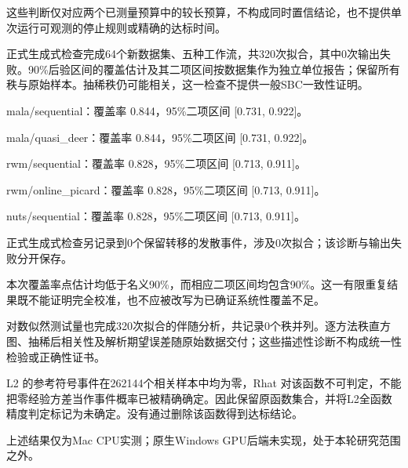 这些判断仅对应两个已测量预算中的较长预算，不构成同时置信结论，也不提供单次运行可观测的停止规则或精确的达标时间。

正式生成式检查完成64个新数据集、五种工作流，共320次拟合，其中0次输出失败。90\%后验区间的覆盖估计及其二项区间按数据集作为独立单位报告；保留所有秩与原始样本。抽稀秩仍可能相关，这一检查不提供一般SBC一致性证明。

\noindent mala/sequential：覆盖率 0.844，95\%二项区间 [0.731, 0.922]。\par

\noindent mala/quasi\_deer：覆盖率 0.844，95\%二项区间 [0.731, 0.922]。\par

\noindent rwm/sequential：覆盖率 0.828，95\%二项区间 [0.713, 0.911]。\par

\noindent rwm/online\_picard：覆盖率 0.828，95\%二项区间 [0.713, 0.911]。\par

\noindent nuts/sequential：覆盖率 0.828，95\%二项区间 [0.713, 0.911]。\par

正式生成式检查另记录到0个保留转移的发散事件，涉及0次拟合；该诊断与输出失败分开保存。

本次覆盖率点估计均低于名义90\%，而相应二项区间均包含90\%。这一有限重复结果既不能证明完全校准，也不应被改写为已确证系统性覆盖不足。

对数似然测试量也完成320次拟合的伴随分析，共记录0个秩并列。逐方法秩直方图、抽稀后相关性及解析期望误差随原始数据交付；这些描述性诊断不构成统一性检验或正确性证书。

L2 的参考符号事件在262144个相关样本中均为零，Rhat 对该函数不可判定，不能把零经验方差当作事件概率已被精确确定。因此保留原函数集合，并将L2全函数精度判定标记为未确定。没有通过删除该函数得到达标结论。

上述结果仅为Mac CPU实测；原生Windows GPU后端未实现，处于本轮研究范围之外。
